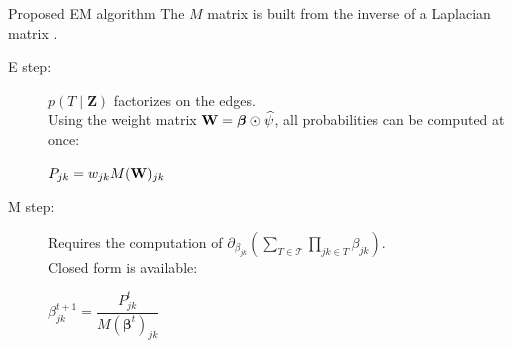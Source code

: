 \documentclass[11pt]{beamer}
\newcommand\betab{{\boldsymbol{\beta}}}
\newcommand\Wb{{\bf W}}
\newcommand{\Zbf}{{\boldsymbol{Z}}}
\newcommand{\emphase}[1]{\textcolor{Complement}{#1}}
\begin{document}
  
  \begin{frame}{Proposed EM algorithm}
The $M$ matrix is built from the inverse of a Laplacian matrix \citep{MeilaJaak}.\vspace{0.5cm}
   
  \begin{description}
  \item[E step:]$p(T\mid\Zbf)$ factorizes on the edges. \\
  Using the weight matrix \emphase{$\Wb = \betab \odot \widehat{\psi}$}, all probabilities can be computed at once:
  \begin{center}
  $P_{jk} = w_{jk} M(\Wb)_{jk}$  \citep{kirshner}  
  \end{center}\vspace{0.5cm}
  \item[M step:] Requires the computation of $\partial_{\beta_{jk}} (\sum_{T\in\mathcal{T}}\prod_{jk\in T} \beta_{jk})$.\\
  Closed form is available:
  \begin{center}
  \emphase{  \large{$\beta_{jk}^{t+1} = \dfrac{P_{jk}^t}{M(\betab^t)_{jk}}$}}
  \end{center}
   \end{description}

  \end{frame}
  


%
%    
\end{document}
